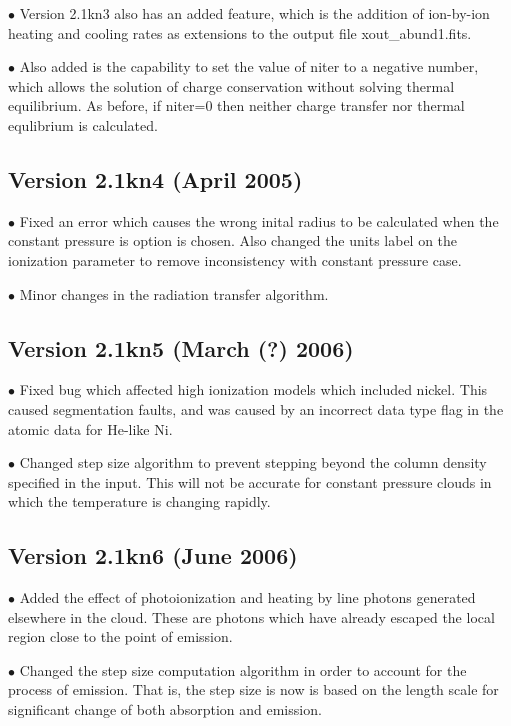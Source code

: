 $\bullet$ Version 2.1kn3 also has an added feature, which is the addition of ion-by-ion 
heating and cooling rates as extensions to the output file xout\_abund1.fits.

$\bullet$ Also added is the capability to set the value of niter to a negative number, which 
allows the solution of charge conservation without solving thermal equilibrium.  As before, 
if niter=0 then neither charge transfer nor thermal equlibrium is calculated.

\subsection{Version 2.1kn4 (April 2005)}

$\bullet$ Fixed an error which causes the wrong inital radius to be calculated 
when the constant pressure is option is chosen.  Also changed the units
label on the ionization parameter to remove inconsistency with constant 
pressure case.

$\bullet$ Minor changes in the radiation transfer algorithm.

\subsection{Version 2.1kn5 (March (?) 2006)}

$\bullet$ Fixed bug which affected high ionization models which included 
nickel.  This caused segmentation faults, and was caused by an incorrect
data type flag in the atomic data for He-like Ni.

$\bullet$ Changed step size algorithm to prevent stepping beyond the 
column density specified in the input.  This will not be accurate 
for constant pressure clouds in which the temperature is changing 
rapidly.

\subsection{Version 2.1kn6 (June 2006)}

$\bullet$ Added the effect of photoionization and heating 
by line photons generated elsewhere in the cloud.  These are photons 
which have already escaped the local region close to the point of emission.

$\bullet$ Changed the step size computation algorithm in order 
to account for the process of emission.  That is, the step size is 
now is based on the length scale for significant change of both absorption 
and emission.

